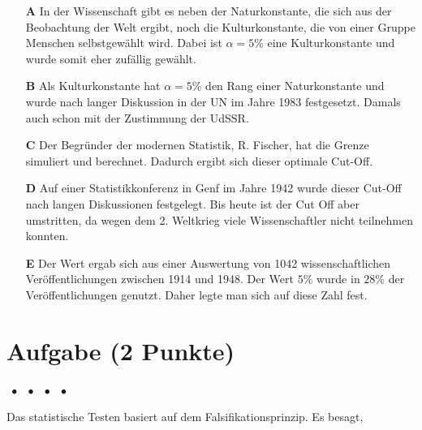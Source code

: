 \documentclass[a4paper, 9pt]{scrartcl}\usepackage[]{graphicx}\usepackage[]{xcolor}
\begin{document}
\begin{enumerate}
\item [\textbf{A} \msquare] In der Wissenschaft gibt es neben der Naturkonstante, die sich aus der Beobachtung der Welt ergibt, noch die Kulturkonstante, die von einer Gruppe Menschen selbstgewählt wird. Dabei ist $\alpha = 5\%$ eine Kulturkonstante und wurde somit eher zufällig gewählt.
\item [\textbf{B} \msquare] Als Kulturkonstante hat $\alpha = 5\%$ den Rang einer Naturkonstante und wurde nach langer Diskussion in der UN im Jahre 1983 festgesetzt. Damals auch schon mit der Zustimmung der UdSSR.
\item [\textbf{C} \msquare] Der Begründer der modernen Statistik, R. Fischer, hat die Grenze simuliert und berechnet. Dadurch ergibt sich dieser optimale Cut-Off.
\item [\textbf{D} \msquare] Auf einer Statistikkonferenz in Genf im Jahre 1942 wurde dieser Cut-Off nach langen Diskussionen festgelegt. Bis heute ist der Cut Off aber umstritten, da wegen dem 2. Weltkrieg viele Wissenschaftler nicht teilnehmen konnten.
\item [\textbf{E} \msquare] Der Wert ergab sich aus einer Auswertung von 1042 wissenschaftlichen Veröffentlichungen zwischen 1914 und 1948. Der Wert $5\%$ wurde in $28\%$ der Veröffentlichungen genutzt. Daher legte man sich auf diese Zahl fest.
\end{enumerate} 

\section{Aufgabe \hfill (2 Punkte)}

\ifcollection
\begin{flushright}
\tiny\vspace{-2Ex}
\textbf{\examinhaltstart}
\exammodulemathstat $\;\bullet$
\exammodulestat $\;\bullet$
\exammodulestatbbv $\;\bullet$
\exammodulestatversuch $\;\bullet$
\exammodulebiostat
\vspace{-1Ex}
\end{flushright}
\fi




Das statistische Testen basiert auf dem Falsifikationsprinzip. Es besagt,
\end{document}
